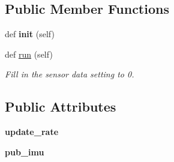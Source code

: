 \subsection*{Public Member Functions}
\begin{DoxyCompactItemize}
\item 
def {\bfseries init} (self)\hypertarget{classfake__node__imu_1_1FakeImu_a672d5a8b50d8996b4e9ed1c57b0815c1}{}\label{classfake__node__imu_1_1FakeImu_a672d5a8b50d8996b4e9ed1c57b0815c1}

\item 
def \hyperlink{classfake__node__imu_1_1FakeImu_a52b19b270ea59d8df00fbad99d0b39f2}{run} (self)
\begin{DoxyCompactList}\small\item\em Fill in the sensor data setting to 0. \end{DoxyCompactList}\end{DoxyCompactItemize}
\subsection*{Public Attributes}
\begin{DoxyCompactItemize}
\item 
{\bfseries update\+\_\+rate}\hypertarget{classfake__node__imu_1_1FakeImu_afc4cf311196ce94a204ae76d67fec37f}{}\label{classfake__node__imu_1_1FakeImu_afc4cf311196ce94a204ae76d67fec37f}

\item 
{\bfseries pub\+\_\+imu}\hypertarget{classfake__node__imu_1_1FakeImu_a0e738903cc497b62692d80dc19179efb}{}\label{classfake__node__imu_1_1FakeImu_a0e738903cc497b62692d80dc19179efb}

\end{DoxyCompactItemize}
